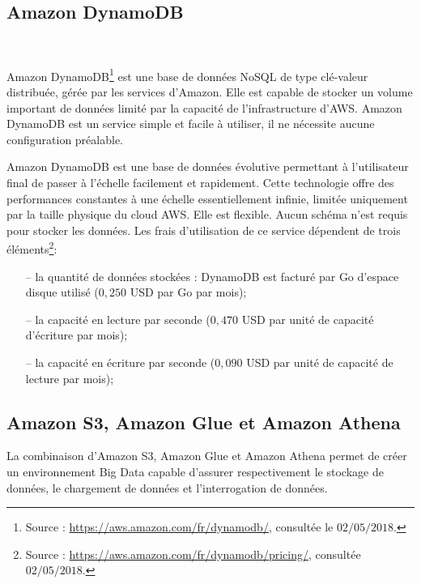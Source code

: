 	\subsection{Amazon DynamoDB}\label{aws:dynmo}~
	
	
	Amazon DynamoDB\footnote{Source : \url{https://aws.amazon.com/fr/dynamodb/}, consultée le $02/05/2018$.} est une base de données NoSQL de type clé-valeur distribuée, gérée par les services d'Amazon. Elle est capable de stocker un volume important de données limité par la capacité de l'infrastructure d'AWS. Amazon DynamoDB   est un service  simple et facile à utiliser,  il ne nécessite aucune configuration préalable. 
	
	Amazon DynamoDB  est une base de données évolutive permettant à l'utilisateur final de passer à l'échelle facilement et rapidement. Cette technologie offre des performances constantes à une échelle essentiellement infinie, limitée uniquement par la taille physique du cloud AWS. Elle est flexible. Aucun schéma n'est requis pour stocker les données. Les frais d'utilisation de ce service dépendent de trois éléments\footnote{Source : \url{https://aws.amazon.com/fr/dynamodb/pricing/}, consultée $02/05/2018$.}:
	\begin{itemize}
		\item[--] la quantité de données stockées : DynamoDB est facturé par Go d'espace disque utilisé ($ 0,250 $ USD par Go par mois);
		\item[--] la capacité en lecture par seconde ($ 0,470 $ USD par unité de capacité d'écriture par mois);
		\item[--]  la capacité en écriture par seconde ($ 0,090 $ USD par unité de capacité de lecture par mois);
	\end{itemize}

\subsection{Amazon S3, Amazon Glue et Amazon Athena }

La combinaison d'Amazon S3, Amazon Glue et Amazon Athena permet de créer un environnement Big Data capable d'assurer respectivement le stockage de données, le chargement de données  et l'interrogation de données. 

